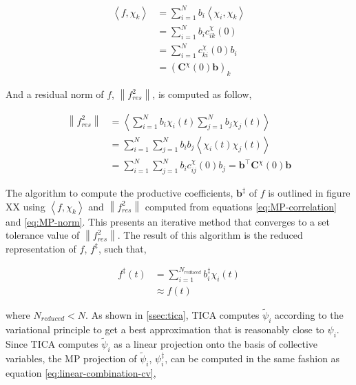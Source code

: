 \begin{spacing}{2.0}
    \begin{equation}\begin{aligned}
        \left<f,\chi_k\right> &= \sum_{i=1}^N b_i\left<\chi_i,\chi_k\right> \\
            &= \sum_{i=1}^N b_i c_{ik}^{\chi}(0) \\
            &= \sum_{i=1}^N c_{ki}^{\chi}(0)b_i \\
            &= \left(\mathbf{C}^{\chi}(0)\mathbf{b}\right)_k
        \label{eq:MP-correlation}
    \end{aligned}\end{equation}

    And a residual norm of $f$, $\left\lVert f_{res}^2 \right\rVert$, is computed as follow,

    \begin{equation}\begin{aligned}
        \left\lVert f_{res}^2 \right\rVert &= \left< \sum_{i=1}^N b_i\chi_i(t) \sum_{j=1}^N b_j\chi_j(t) \right> \\
            &= \sum_{i=1}^N \sum_{j=1}^N b_i b_j \left<\chi_i(t)\chi_j(t)\right> \\
            &= \sum_{i=1}^N \sum_{j=1}^N b_i c^{\chi}_{ij}(0) b_j = \mathbf{b}^{\top}\mathbf{C}^{\chi}(0)\mathbf{b}
        \label{eq:MP-norm}
    \end{aligned}\end{equation}


    The algorithm to compute the productive coefficients, $\mathbf{b}^{\ddagger}$ of $f$ is outlined in figure XX using $\left<f,\chi_k\right>$
    and $\left\lVert f_{res}^2 \right\rVert$ computed from equations \ref{eq:MP-correlation} and \ref{eq:MP-norm}. This presents an iterative 
    method that converges to a set tolerance value of $\left\lVert f_{res}^2 \right\rVert$. The result of this algorithm is the reduced 
    representation of $f$, $f^{\ddagger}$, such that,

    \begin{equation}\begin{aligned}
        f^{\ddagger}(t) &= \sum_{i=1}^{N_{reduced}} b_i^{\ddagger}\chi_i(t) \\
            &\approx f(t)
    \end{aligned}\end{equation}

    \noindent where $N_{reduced} < N$. As shown in \ref{ssec:tica}, TICA computes $\tilde{\psi}_i$ according to the variational principle to get 
    a best approximation that is reasonably close to $\psi_i$. Since TICA computes $\tilde{\psi}_i$ as a linear projection onto the basis of 
    collective variables, the MP projection of $\tilde{\psi}_i$, $\psi_i^{\ddagger}$, can be computed in the same fashion as equation
    \ref{eq:linear-combination-cv},


\end{spacing}
